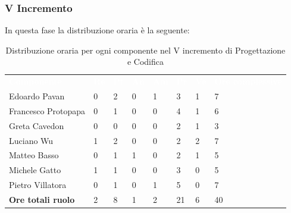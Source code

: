 \subsubsection{V Incremento}
In questa fase la distribuzione oraria è la seguente:
\begin{table}[H]
\begin{center}
\renewcommand{\arraystretch}{1.25}
\begin{tabular}{ m{}<{\centering}  m{}<{\centering} m{}<{\centering} m{}<{\centering}  m{}<{\centering}  m{}<{\centering}  m{}<{\centering}  m{}<{\centering}   }
	\rowcolor{darkblue}
	\textcolor{white}{\textbf{Componente}} &\textcolor{white}{\textbf{Re}}&\textcolor{white}{\textbf{Pt}}&\textcolor{white}{\textbf{An}}&\textcolor{white}{\textbf{Am}}&\textcolor{white}{\textbf{Pr}}&\textcolor{white}{\textbf{Ve}}&\textcolor{white}{\textbf{Ore complessive}}\\ 
	Edoardo Pavan & 0 & 2 & 0 & 1 & 3 & 1 & 7 \\	
	
	Francesco Protopapa & 0 & 1 & 0 & 0 & 4 & 1 & 6 \\

	Greta Cavedon & 0 & 0 & 0 & 0 & 2 & 1 & 3 \\
	
	Luciano Wu & 1 & 2 & 0 & 0 & 2 & 2 & 7 \\
	
	Matteo Basso & 0 & 1 & 1 & 0 & 2 & 1 & 5 \\
	
	Michele Gatto & 1 & 1 & 0 & 0 & 3 & 0 & 5 \\
	
	Pietro Villatora & 0 & 1 & 0 & 1 & 5 & 0 & 7 \\
	
	\textbf{Ore totali ruolo} & 2 & 8 & 1 & 2 & 21 & 6 & 40 \\

\end{tabular}
\caption{Distribuzione oraria per ogni componente nel V incremento di Progettazione e Codifica}
\end{center}
\end{table}

